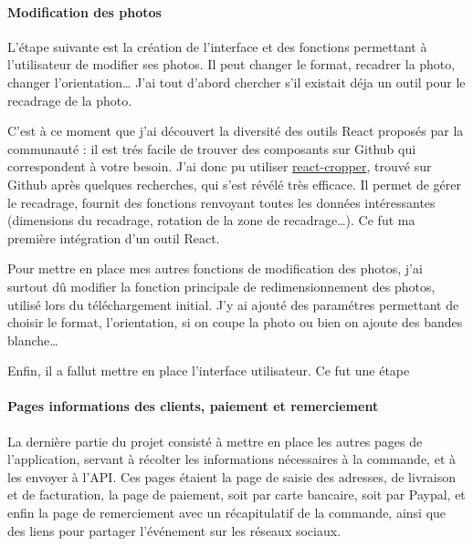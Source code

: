 \documentclass[12pt,a4paper]{article}
\begin{document}
  \bigskip

  \paragraph{Modification des photos}\label{modification-des-photos}

  \bigskip

  L'étape suivante est la création de l'interface et des fonctions
  permettant à l'utilisateur de modifier ses photos. Il peut changer le
  format, recadrer la photo, changer l'orientation\ldots{} J'ai tout
  d'abord chercher s'il existait déja un outil pour le recadrage de la
  photo.

  \bigskip

  C'est à ce moment que j'ai découvert la diversité des outils React
  proposés par la communauté : il est trés facile de trouver des
  composants sur Github qui correspondent à votre besoin. J'ai donc pu
  utiliser
  \href{https://github.com/roadmanfong/react-cropper}{react-cropper},
  trouvé sur Github après quelques recherches, qui s'est révélé très
  efficace. Il permet de gérer le recadrage, fournit des fonctions
  renvoyant toutes les données intéressantes (dimensions du recadrage,
  rotation de la zone de recadrage\ldots{}). Ce fut ma première
  intégration d'un outil React.

  \bigskip

  Pour mettre en place mes autres fonctions de modification des photos,
  j'ai surtout dû modifier la fonction principale de redimensionnement des
  photos, utilisé lors du téléchargement initial. J'y ai ajouté des
  paramétres permettant de choisir le format, l'orientation, si on coupe
  la photo ou bien on ajoute des bandes blanche\ldots{}

  \bigskip

  Enfin, il a fallut mettre en place l'interface utilisateur. Ce fut une
  étape

  \paragraph{Pages informations des clients, paiement et
  remerciement}\label{pages-informations-des-clients-paiement-et-remerciement}

  \bigskip

  La dernière partie du projet consisté à mettre en place les autres pages
  de l'application, servant à récolter les informations nécessaires à la
  commande, et à les envoyer à l'API. Ces pages étaient la page de saisie
  des adresses, de livraison et de facturation, la page de paiement, soit
  par carte bancaire, soit par Paypal, et enfin la page de remerciement
  avec un récapitulatif de la commande, ainsi que des liens pour partager
  l'événement sur les réseaux sociaux.
\end{document}
